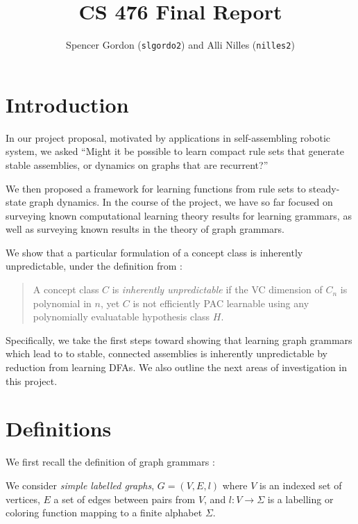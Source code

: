 \documentclass[]{article}
\title{CS 476 Final Report}
\author{Spencer Gordon (\texttt{slgordo2}) and Alli Nilles (\texttt{nilles2})}
\date{}
\begin{document}
\maketitle

\newcommand{\step}[1]{\xrightarrow{#1}}
\newcommand{\steps}[1]{\xRightarrow{#1}}

\section{Introduction}

In our project proposal, motivated by applications in self-assembling
robotic system, we asked ``Might it be possible to learn compact rule
sets that generate stable assemblies, or dynamics on graphs that are
recurrent?''

We then proposed a framework for learning functions from rule sets to
steady-state graph dynamics. In the course of the project, we have so
far focused on surveying known computational learning theory results for
learning grammars, as well as surveying known results in the theory of
graph grammars.

We show that a particular formulation of a concept class is inherently
unpredictable, under the definition from \cite{kearns1994}:

\begin{quote}
A concept class \(C\) is \emph{inherently unpredictable} if the VC
dimension of \(C_n\) is polynomial in \(n\), yet \(C\) is not
efficiently PAC learnable using any polynomially evaluatable hypothesis
class \(H\).
\end{quote}

Specifically, we take the first steps toward showing that learning graph
grammars which lead to to stable, connected assemblies is inherently
unpredictable by reduction from learning DFAs. We also outline the next areas of
investigation in this project.

\section{Definitions}\label{definitions}

We first recall the definition of graph grammars \cite{litovsky}
\cite{klavins}:

We consider \emph{simple labelled graphs}, \(G = (V,E,l)\) where \(V\)
is an indexed set of vertices, \(E\) a set of edges between pairs from
\(V\), and \(l: V \to \Sigma\) is a labelling or coloring function mapping to a
finite alphabet $\Sigma$.
\end{document}
